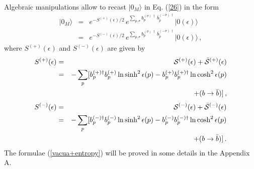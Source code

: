 \noindent Algebraic manipulations allow to recast $|0_M \rangle$
in Eq. (\ref{26}) in the form
\begin{eqnarray}\label{vacua+entropy}
  |0_M\rangle &=& e^{-S^{(+)}(\epsilon)/2}\,
        e^{\sum_{p, \sigma}b^{(\sigma)\, \dagger}_p\,
        {\bar b}^{(-\sigma)\, \dagger}_{\tilde
        p}}|0(\epsilon)\rangle
        \\
        &=& e^{-S^{(-)}(\epsilon)/2}\,
        e^{\sum_{p, \sigma}b^{(\sigma)\, \dagger}_p\,
        {\bar b}^{(-\sigma)\, \dagger}_{\tilde
        p}}|0(\epsilon)\rangle \,,
        \nonumber
\end{eqnarray}
where $S^{(+)}(\epsilon)$ and $S^{(-)}(\epsilon)$ are given by
 \begin{eqnarray}\label{S+}
 S^{(+)}(\epsilon)&=& {\cal S}^{(+)}(\epsilon) + \bar{\cal
 S}^{(+)}(\epsilon) \\
 &=& - \sum_p [b_p^{(+) \dagger} b_p^{(+)}
  \ln\sinh^2\epsilon (p)
 - b_p^{(+)} b_p^{(+)\dagger} \ln\cosh^2\epsilon
 (p) \nonumber \\
 & & + (b \to \bar{b})] \,, \nonumber
 \end{eqnarray}
 \begin{eqnarray}\label{S-}
 S^{(-)}(\epsilon)&=& {\cal S}^{(-)}(\epsilon) + \bar{\cal
 S}^{(-)}(\epsilon) \\
 &=& - \sum_p [b_p^{(-) \dagger} b_p^{(-)} \ln\sinh^2\epsilon (p)
 - b_p^{(-)} b_p^{(-)\dagger} \ln\cosh^2\epsilon
 (p) \nonumber \\
 & & + (b \to \bar{b})] \,. \nonumber
 \end{eqnarray}
The formulae (\ref{vacua+entropy}) will be proved in some details
in the Appendix A.

